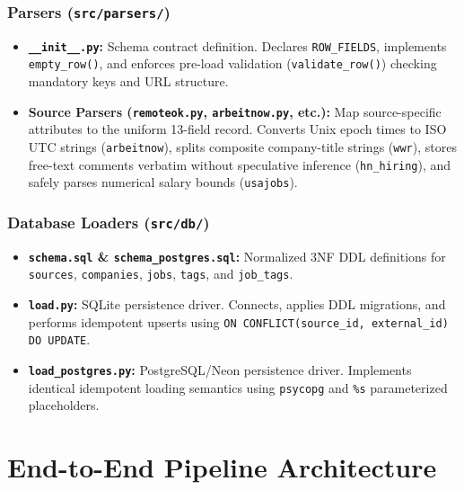\documentclass[10pt,letterpaper]{article}
\begin{document}
\subsubsection{Parsers (\texttt{src/parsers/})}
\begin{itemize}[leftmargin=1.5em]
    \item \textbf{\texttt{\_\_init\_\_.py}:} Schema contract definition. Declares \texttt{ROW\_FIELDS}, implements \texttt{empty\_row()}, and enforces pre-load validation (\texttt{validate\_row()}) checking mandatory keys and URL structure.
    \item \textbf{Source Parsers (\texttt{remoteok.py}, \texttt{arbeitnow.py}, etc.):} Map source-specific attributes to the uniform 13-field record. Converts Unix epoch times to ISO UTC strings (\texttt{arbeitnow}), splits composite company-title strings (\texttt{wwr}), stores free-text comments verbatim without speculative inference (\texttt{hn\_hiring}), and safely parses numerical salary bounds (\texttt{usajobs}).
\end{itemize}

\subsubsection{Database Loaders (\texttt{src/db/})}
\begin{itemize}[leftmargin=1.5em]
    \item \textbf{\texttt{schema.sql} \& \texttt{schema\_postgres.sql}:} Normalized 3NF DDL definitions for \texttt{sources}, \texttt{companies}, \texttt{jobs}, \texttt{tags}, and \texttt{job\_tags}.
    \item \textbf{\texttt{load.py}:} SQLite persistence driver. Connects, applies DDL migrations, and performs idempotent upserts using \texttt{ON CONFLICT(source\_id, external\_id) DO UPDATE}.
    \item \textbf{\texttt{load\_postgres.py}:} PostgreSQL/Neon persistence driver. Implements identical idempotent loading semantics using \texttt{psycopg} and \texttt{\%s} parameterized placeholders.
\end{itemize}

\newpage
\section{End-to-End Pipeline Architecture}
\end{document}
